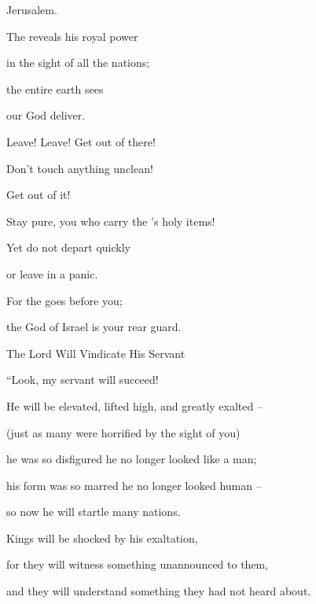 {Jerusalem.
\par }{\Q {}The
{}
reveals
his royal power
\par }{\Q in the sight
of all
the nations;
\par }{\Q the entire
earth
sees
\par }{\Q our God
deliver.
\par }{\Q {}Leave! Leave! Get out
of there!
\par }{\Q Don’t
touch
anything unclean!
\par }{\Q Get out
of it!
\par }{\Q Stay pure,
you who carry
the
{}’s
holy items!
\par }{\Q {}Yet
do not
depart
quickly
\par }{\Q or
leave
in a panic.
\par }{\Q For
the
{}
goes
before
you;
\par }{\Q the God
of Israel
is your rear guard.
\par }{\SH The Lord Will Vindicate His Servant
\par }{\Q {}“Look,
my servant
will succeed!

\par }{\Q He will be elevated,
lifted
high,
and greatly
exalted –
\par }{\Q {}(just
as many
were horrified
by
the sight of you)

\par }{\Q he was so
disfigured
he no longer looked like
a man;
\par }{\Q {}his form was so
marred he no longer looked human –
\par }{\Q so now he will startle many nations.
\par }{\Q Kings will be shocked by his exaltation,
\par }{\Q for they will witness something unannounced to them,
\par }{\Q and they will understand something they had not heard about.

\par }
